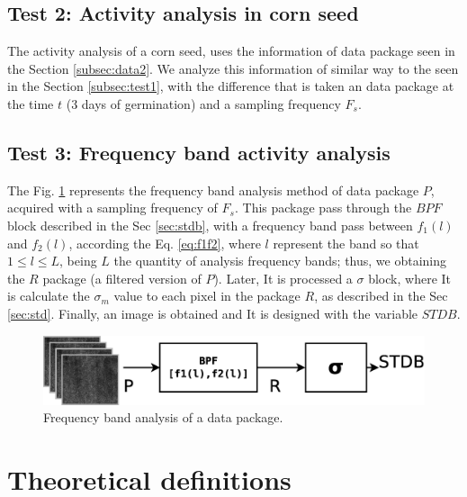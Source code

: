 \documentclass[review]{elsarticle}
\begin{document}
\subsection{Test 2: Activity analysis in corn seed}
\label{subsec:test2}
The activity analysis of a corn seed, 
uses the information of data package seen in the Section \ref{subsec:data2}.
We analyze this information of similar way to the seen in the Section \ref{subsec:test1},
with the difference that is taken an data package at the time $t$ (3 days of germination)
and a sampling frequency $F_s$. 

\subsection{Test 3: Frequency band activity analysis}
\label{subsec:test3}

The Fig. \ref{fig:test3} represents the frequency band analysis method of data package $P$, 
acquired  with a sampling frequency of $F_s$. This package pass through the $BPF$ block
described in the Sec \ref{sec:stdb}, with a frequency band pass between $f_1(l)$ and $f_2(l)$,
according the Eq. \ref{eq:f1f2}, where $l$ represent the band so that $1\leq l\leq L$,
being $L$ the quantity of analysis frequency bands; 
thus, we obtaining the  $R$ package (a filtered version of $P$). Later, It is processed 
a $\sigma$ block, where It is calculate the $\sigma_{m}$ value to each pixel in the package $R$,
as described in the Sec \ref{sec:std}. Finally, 
an image is obtained and It is designed with the variable $STDB$.
\begin{figure}[ht!]
\centering
\includegraphics[width=0.55\columnwidth]{test3.eps}
\caption{Frequency band analysis of a data package.}
\label{fig:test3}
\end{figure}

 

\section{Theoretical definitions}
\label{sec:theoretical}
\end{document}
